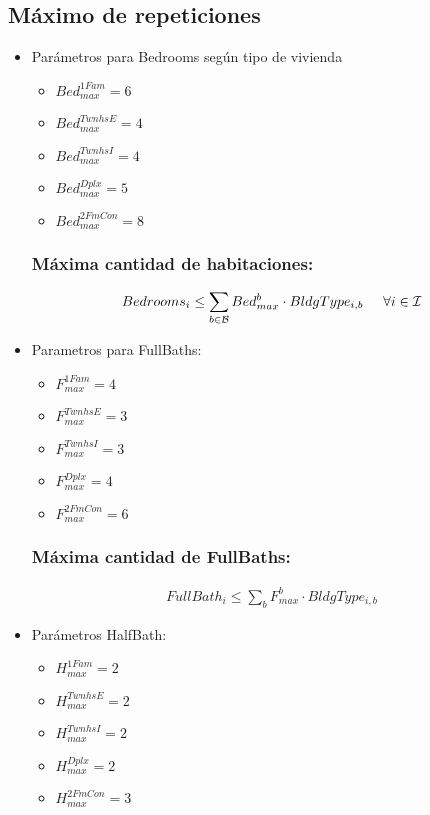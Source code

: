\documentclass{article}
\begin{document}
\subsection{Máximo de repeticiones}
\begin{itemize}
    \item Parámetros para Bedrooms según tipo de vivienda
    \begin{itemize}
        \item $Bed_{max}^{1Fam}=6$\\
        \item $Bed_{max}^{TwnhsE}=4$\\
        \item $Bed_{max}^{TwnhsI}=4$\\
        \item $Bed_{max}^{Dplx}=5$\\
        \item $Bed_{max}^{2FmCon}=8$
    \end{itemize}
    \subsubsection{Máxima cantidad de habitaciones:}
    \begin{align}
        Bedrooms_{i}\leq \sum_{b \in \mathcal{B}}Bed_{max}^{b} \cdot BldgType_{i,b} \hspace{5mm } \forall i \in \mathcal{I}
    \end{align}
    \item  Parametros para FullBaths:
    \begin{itemize}
        \item $F_{max}^{1Fam}=4$\\
        \item $F_{max}^{TwnhsE}=3$\\
        \item $F_{max}^{TwnhsI}=3$\\
        \item $F_{max}^{Dplx}=4$\\
        \item $F_{max}^{2FmCon}=6$
    \end{itemize}
    \subsubsection{Máxima cantidad de FullBaths:}
    \begin{align}
        FullBath_{i} \leq \sum_{b} F_{max}^{b} \cdot BldgType_{i,b}
    \end{align}
    \item Parámetros HalfBath:
    \begin{itemize}
        \item $H_{max}^{1Fam}=2$\\
        \item $H_{max}^{TwnhsE}=2$\\
        \item $H_{max}^{TwnhsI}=2$\\
        \item $H_{max}^{Dplx}=2$\\
        \item $H_{max}^{2FmCon}=3$
    \end{itemize}

\end{itemize}
\end{document}
